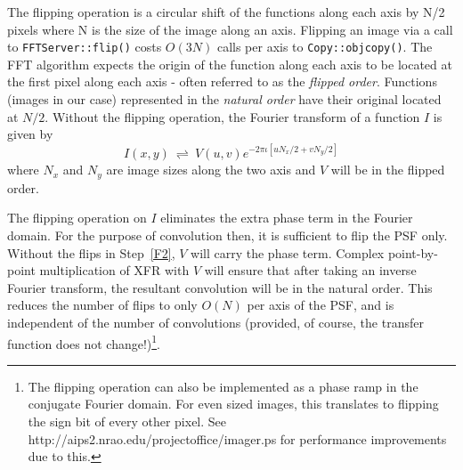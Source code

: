 The flipping operation is a circular shift of the functions along each
axis by N/2 pixels where N is the size of the image along an axis.
Flipping an image via a call to {\tt FFTServer::flip()} costs $O(3N)$
calls per axis to {\tt Copy::objcopy()}.  The FFT algorithm expects
the origin of the function along each axis to be located at the first
pixel along each axis - often referred to as the {\it flipped order}.
Functions (images in our case) represented in the {\it natural order}
have their original located at $N/2$.  Without the flipping operation,
the Fourier transform of a function $I$ is given by
\begin{equation}
I(x,y)~ \rightleftharpoons ~ V(u,v) e^{-2\pi\iota\left[u N_x/2 + v N_y/2\right]}
\end{equation}
where $N_x$ and $N_y$ are image sizes along the two axis and $V$ will
be in the flipped order.

The flipping operation on $I$ eliminates the extra phase term in the
Fourier domain.  For the purpose of convolution then, it is sufficient
to flip the PSF only.  Without the flips in Step~\ref{F2}, $V$ will
carry the phase term.  Complex point-by-point multiplication of XFR
with $V$ will ensure that after taking an inverse Fourier transform,
the resultant convolution will be in the natural order.  This reduces
the number of flips to only $O(N)$ per axis of the PSF, and is
independent of the number of convolutions (provided, of course, the
transfer function does not change!)\footnote{The flipping operation
can also be implemented as a phase ramp in the conjugate Fourier
domain.  For even sized images, this translates to flipping the sign
bit of every other pixel.  See
http://aips2.nrao.edu/projectoffice/imager.ps for performance
improvements due to this.}.







